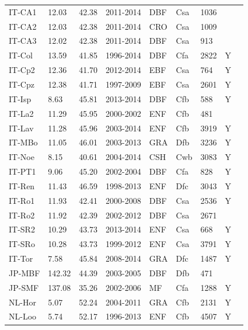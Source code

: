 \documentclass{myreport}
\begin{document}
\begin{longtable}{lllllllll}
  IT-CA1 & 12.03 & 42.38 & 2011-2014 & DBF & Csa & 1036 &  & \cite{IT-CA1} \\ 
  IT-CA2 & 12.03 & 42.38 & 2011-2014 & CRO & Csa & 1009 &  & \cite{IT-CA2} \\ 
  IT-CA3 & 12.02 & 42.38 & 2011-2014 & DBF & Csa & 913 &  & \cite{IT-CA3} \\ 
  IT-Col & 13.59 & 41.85 & 1996-2014 & DBF & Cfa & 2822 & Y & \cite{IT-Col} \\ 
  IT-Cp2 & 12.36 & 41.70 & 2012-2014 & EBF & Csa & 764 & Y & \cite{IT-Cp2} \\ 
  IT-Cpz & 12.38 & 41.71 & 1997-2009 & EBF & Csa & 2601 & Y & \cite{IT-Cpz} \\ 
  IT-Isp & 8.63 & 45.81 & 2013-2014 & DBF & Cfb & 588 & Y & \cite{IT-Isp} \\ 
  IT-La2 & 11.29 & 45.95 & 2000-2002 & ENF & Cfb & 481 &  & \cite{IT-La2} \\ 
  IT-Lav & 11.28 & 45.96 & 2003-2014 & ENF & Cfb & 3919 & Y & \cite{IT-Lav} \\ 
  IT-MBo & 11.05 & 46.01 & 2003-2013 & GRA & Dfb & 3236 & Y & \cite{IT-MBo} \\ 
  IT-Noe & 8.15 & 40.61 & 2004-2014 & CSH & Cwb & 3083 & Y & \cite{IT-Noe} \\ 
  IT-PT1 & 9.06 & 45.20 & 2002-2004 & DBF & Cfa & 828 & Y & \cite{IT-PT1} \\ 
  IT-Ren & 11.43 & 46.59 & 1998-2013 & ENF & Dfc & 3043 & Y & \cite{IT-Ren} \\ 
  IT-Ro1 & 11.93 & 42.41 & 2000-2008 & DBF & Csa & 2536 & Y & \cite{IT-Ro1} \\ 
  IT-Ro2 & 11.92 & 42.39 & 2002-2012 & DBF & Csa & 2671 &  & \cite{IT-Ro2} \\ 
  IT-SR2 & 10.29 & 43.73 & 2013-2014 & ENF & Csa & 668 & Y & \cite{IT-SR2} \\ 
  IT-SRo & 10.28 & 43.73 & 1999-2012 & ENF & Csa & 3791 & Y & \cite{IT-SRo} \\ 
  IT-Tor & 7.58 & 45.84 & 2008-2014 & GRA & Dfc & 1487 & Y & \cite{IT-Tor} \\ 
  JP-MBF & 142.32 & 44.39 & 2003-2005 & DBF & Dfb & 471 &  & \cite{JP-MBF} \\ 
  JP-SMF & 137.08 & 35.26 & 2002-2006 & MF & Cfa & 1288 & Y & \cite{JP-SMF} \\ 
  NL-Hor & 5.07 & 52.24 & 2004-2011 & GRA & Cfb & 2131 & Y & \cite{NL-Hor} \\ 
  NL-Loo & 5.74 & 52.17 & 1996-2013 & ENF & Cfb & 4507 & Y & \cite{NL-Loo} \\ 

\end{longtable}
\end{document}
